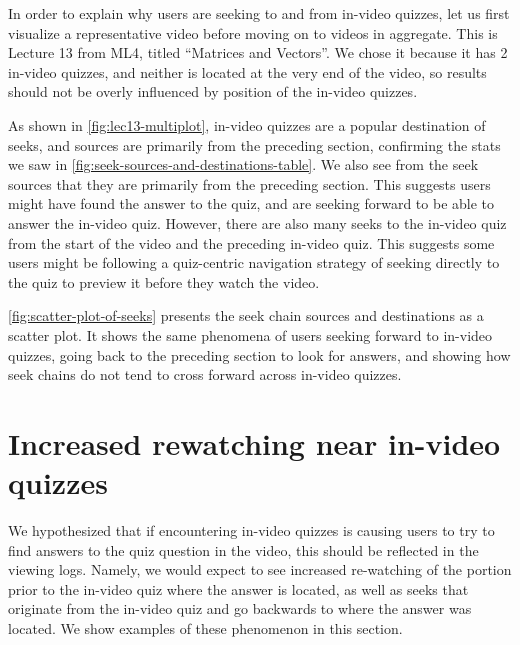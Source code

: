 \documentclass{sigchi}
\begin{document}
In order to explain why users are seeking to and from in-video quizzes, let us first visualize a representative video before moving on to videos in aggregate. This is Lecture 13 from ML4, titled ``Matrices and Vectors''. We chose it because it has 2 in-video quizzes, and neither is located at the very end of the video, so results should not be overly influenced by position of the in-video quizzes.

As shown in \autoref{fig:lec13-multiplot}, in-video quizzes are a popular destination of seeks, and sources are primarily from the preceding section, confirming the stats we saw in \autoref{fig:seek-sources-and-destinations-table}. We also see from the seek sources that they are primarily from the preceding section. This suggests users might have found the answer to the quiz, and are seeking forward to be able to answer the in-video quiz. However, there are also many seeks to the in-video quiz from the start of the video and the preceding in-video quiz. This suggests some users might be following a quiz-centric navigation strategy of seeking directly to the quiz to preview it before they watch the video.


\autoref{fig:scatter-plot-of-seeks} presents the seek chain sources and destinations as a scatter plot. It shows the same phenomena of users seeking forward to in-video quizzes, going back to the preceding section to look for answers, and showing how seek chains do not tend to cross forward across in-video quizzes.

\section{Increased rewatching near in-video quizzes}

We hypothesized that if encountering in-video quizzes is causing users to try to find answers to the quiz question in the video, this should be reflected in the viewing logs. Namely, we would expect to see increased re-watching of the portion prior to the in-video quiz where the answer is located, as well as seeks that originate from the in-video quiz and go backwards to where the answer was located. We show examples of these phenomenon in this section.
\end{document}
